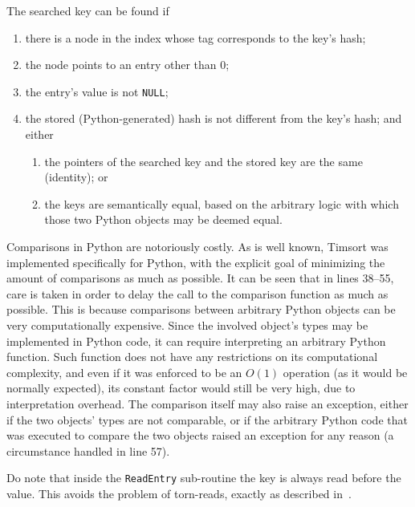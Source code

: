 The searched key can be found if
\begin{enumerate}
	\item there is a node in the index whose tag corresponds to the key's hash;
	\item the node points to an entry other than 0;
	\item the entry's value is not \texttt{NULL};
	\item the stored (Python-generated) hash is not different from the key's hash; and either
	\begin{enumerate}
		\item the pointers of the searched key and the stored key are the same (identity); or
		\item the keys are semantically equal, based on the arbitrary logic with which those two Python objects may be deemed equal.
	\end{enumerate}
\end{enumerate}

Comparisons in Python are notoriously costly.
As is well known, Timsort was implemented specifically for Python, with the explicit goal of minimizing the amount of comparisons as much as possible.
It can be seen that in lines 38--55, care is taken in order to delay the call to the comparison function as much as possible.
This is because comparisons between arbitrary Python objects can be very computationally expensive.
Since the involved object's types may be implemented in Python code, it can require interpreting an arbitrary Python function.
Such function does not have any restrictions on its computational complexity, and even if it was enforced to be an $O(1)$ operation (as it would be normally expected), its constant factor would still be very high, due to interpretation overhead.
The comparison itself may also raise an exception, either if the two objects' types are not comparable, or if the arbitrary Python code that was executed to compare the two objects raised an exception for any reason (a circumstance handled in line 57).

Do note that inside the \texttt{ReadEntry} sub-routine the key is always read before the value.
This avoids the problem of torn-reads, exactly as described in~\cite[\S4, Lookup]{maier}.

